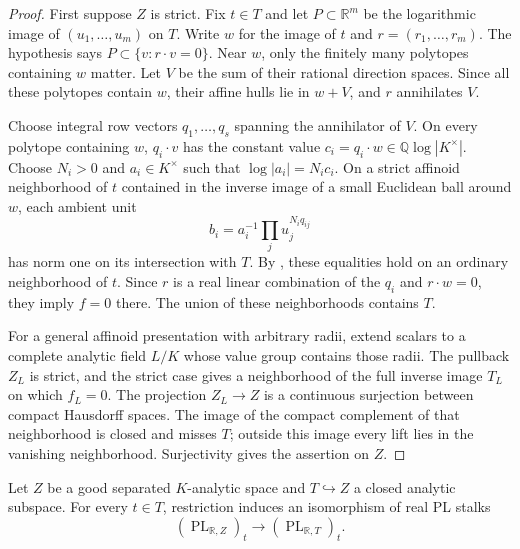 \begin{proof}
First suppose $Z$ is strict. Fix $t\in T$ and let $P\subset\mathbb R^m$ be the logarithmic image of $(u_1,\ldots,u_m)$ on $T$. Write $w$ for the image of $t$ and $r=(r_1,\ldots,r_m)$. The hypothesis says $P\subset\{v:r\cdot v=0\}$. Near $w$, only the finitely many polytopes containing $w$ matter. Let $V$ be the sum of their rational direction spaces. Since all these polytopes contain $w$, their affine hulls lie in $w+V$, and $r$ annihilates $V$.

Choose integral row vectors $q_1,\ldots,q_s$ spanning the annihilator of $V$. On every polytope containing $w$, $q_i\cdot v$ has the constant value $c_i=q_i\cdot w\in\mathbb Q\log|K^\times|$. Choose $N_i>0$ and $a_i\in K^\times$ such that $\log|a_i|=N_ic_i$. On a strict affinoid neighborhood of $t$ contained in the inverse image of a small Euclidean ball around $w$, each ambient unit
\[
 b_i=a_i^{-1}\prod_j u_j^{N_iq_{ij}}
\]
has norm one on its intersection with $T$. By , these equalities hold on an ordinary neighborhood of $t$. Since $r$ is a real linear combination of the $q_i$ and $r\cdot w=0$, they imply $f=0$ there. The union of these neighborhoods contains $T$.

For a general affinoid presentation with arbitrary radii, extend scalars to a complete analytic field $L/K$ whose value group contains those radii. The pullback $Z_L$ is strict, and the strict case gives a neighborhood of the full inverse image $T_L$ on which $f_L=0$. The projection $Z_L\to Z$ is a continuous surjection between compact Hausdorff spaces. The image of the compact complement of that neighborhood is closed and misses $T$; outside this image every lift lies in the vanishing neighborhood. Surjectivity gives the assertion on $Z$.
\end{proof}

\begin{proposition}\label{prop:supplied-p061-closed-pl-germs}
Let $Z$ be a good separated $K$-analytic space and $T\hookrightarrow Z$ a closed analytic subspace. For every $t\in T$, restriction induces an isomorphism of real PL stalks
\[
 (\operatorname{PL}_{\mathbb R,Z})_t\longrightarrow(\operatorname{PL}_{\mathbb R,T})_t.
\]
\end{proposition}

